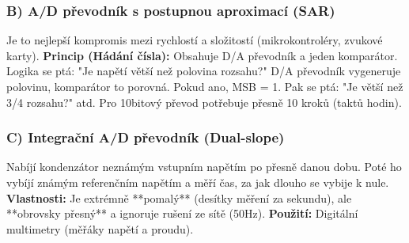 \documentclass[a4paper,10pt]{article}
\begin{document}
\begin{vysvetlenibox}
\subsubsection*{B) A/D převodník s postupnou aproximací (SAR)}
Je to nejlepší kompromis mezi rychlostí a složitostí (mikrokontroléry, zvukové karty).
\textbf{Princip (Hádání čísla):} Obsahuje D/A převodník a jeden komparátor. Logika se ptá: "Je napětí větší než polovina rozsahu?" D/A převodník vygeneruje polovinu, komparátor to porovná. Pokud ano, MSB = 1. Pak se ptá: "Je větší než 3/4 rozsahu?" atd.
Pro 10bitový převod potřebuje přesně 10 kroků (taktů hodin).

\subsubsection*{C) Integrační A/D převodník (Dual-slope)}
Nabíjí kondenzátor neznámým vstupním napětím po přesně danou dobu. Poté ho vybíjí známým referenčním napětím a měří čas, za jak dlouho se vybije k nule.
\textbf{Vlastnosti:} Je extrémně **pomalý** (desítky měření za sekundu), ale **obrovsky přesný** a ignoruje rušení ze sítě (50Hz).
\textbf{Použití:} Digitální multimetry (měřáky napětí a proudu).

\end{vysvetlenibox}
\end{document}
